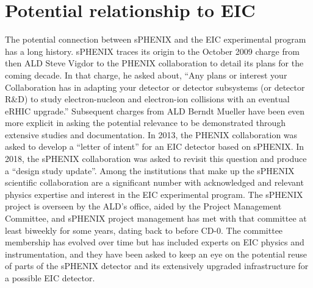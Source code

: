\section{Potential relationship to EIC}
\label{sec:eic}

The potential connection between sPHENIX and the EIC experimental
program has a long history.  sPHENIX traces its origin to the October
2009 charge from then ALD Steve Vigdor to the PHENIX collaboration to
detail its plans for the coming decade.  In that charge, he asked
about, ``Any plans or interest your Collaboration has in adapting your
detector or detector subsystems (or detector R\&D) to study
electron-nucleon and electron-ion collisions with an eventual eRHIC
upgrade.''  Subsequent charges from ALD Berndt Mueller have been even
more explicit in asking the potential relevance to be demonstrated
through extensive studies and documentation.  In 2013, the PHENIX
collaboration was asked to develop a ``letter of intent'' for an EIC
detector based on sPHENIX.  In 2018, the sPHENIX collaboration was
asked to revisit this question and produce a ``design study update''.
Among the institutions that make up the sPHENIX scientific
collaboration are a significant number with acknowledged and relevant
physics expertise and interest in the EIC experimental program.  The
sPHENIX project is overseen by the ALD's office, aided by the Project
Management Committee, and sPHENIX project management has met with that
committee at least biweekly for some years, dating back to before
CD-0.  The committee membership has evolved over time but has included
experts on EIC physics and instrumentation, and they have been asked
to keep an eye on the potential reuse of parts of the sPHENIX detector
and its extensively upgraded infrastructure for a possible EIC
detector.

